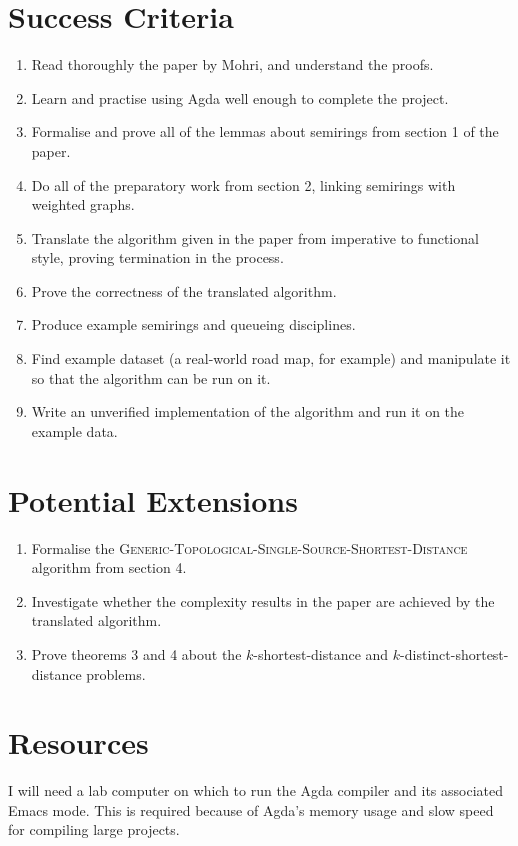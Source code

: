 \section*{Success Criteria}
\begin{enumerate}
  \item
    Read thoroughly the paper by Mohri, and understand the proofs.
  \item
    Learn and practise using Agda well enough to complete the project.
  \item
    Formalise and prove all of the lemmas about semirings from section 1 of the paper.
  \item
    Do all of the preparatory work from section 2, linking semirings with weighted graphs.
  \item
    Translate the algorithm given in the paper from imperative to functional style, proving termination in the process.
  \item
    Prove the correctness of the translated algorithm.
  \item
    Produce example semirings and queueing disciplines.
  \item
    Find example dataset (a real-world road map, for example) and manipulate it so that the algorithm can be run on it.
  \item
    Write an unverified implementation of the algorithm and run it on the example data.
\end{enumerate}

\section*{Potential Extensions}
\begin{enumerate}
  \item
    Formalise the \textsc{Generic-Topological-Single-Source-Shortest-Distance} algorithm from section 4.
  \item
    Investigate whether the complexity results in the paper are achieved by the translated algorithm.
  \item
    Prove theorems 3 and 4 about the $k$-shortest-distance and $k$-distinct-shortest-distance problems.
\end{enumerate}

\section*{Resources}
I will need a lab computer on which to run the Agda compiler and its associated Emacs mode.
This is required because of Agda's memory usage and slow speed for compiling large projects.

